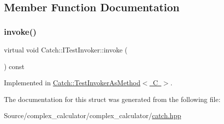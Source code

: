 \subsection{Member Function Documentation}
\mbox{\label{struct_catch_1_1_i_test_invoker_a6fcd5c5b67d6d5ade6491ff33411ca7f}} 
\subsubsection{\texorpdfstring{invoke()}{invoke()}}
{\footnotesize\ttfamily virtual void Catch\+::\+I\+Test\+Invoker\+::invoke (\begin{DoxyParamCaption}{ }\end{DoxyParamCaption}) const\hspace{0.3cm}{\ttfamily [pure virtual]}}



Implemented in \mbox{\hyperlink{class_catch_1_1_test_invoker_as_method_a8115a06efe273f4112ec0b5452c1b5f2}{Catch\+::\+Test\+Invoker\+As\+Method$<$ C $>$}}.



The documentation for this struct was generated from the following file\+:\begin{DoxyCompactItemize}
\item 
Source/complex\+\_\+calculator/complex\+\_\+calculator/\mbox{\hyperlink{catch_8hpp}{catch.\+hpp}}\end{DoxyCompactItemize}
